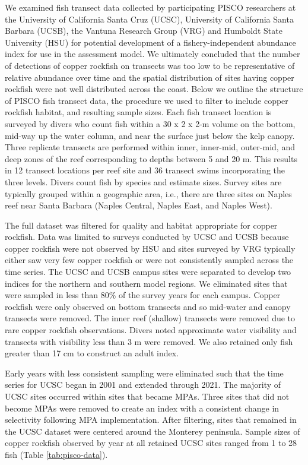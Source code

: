 \documentclass[11pt,
  english,
  letterpaper,
]{article}
\begin{document}
We examined fish transect data collected by participating PISCO researchers at the University of California Santa Cruz (UCSC), University of California Santa Barbara (UCSB), the Vantuna Research Group (VRG) and Humboldt State University (HSU) for potential development of a fishery-independent abundance index for use in the assessment model. We ultimately concluded that the number of detections of copper rockfish on transects was too low to be representative of relative abundance over time and the spatial distribution of sites having copper rockfish were not well distributed across the coast. Below we outline the structure of PISCO fish transect data, the procedure we used to filter to include copper rockfish habitat, and resulting sample sizes. Each fish transect location is surveyed by divers who count fish within a 30 x 2 x 2-m volume on the bottom, mid-way up the water column, and near the surface just below the kelp canopy. Three replicate transects are performed within inner, inner-mid, outer-mid, and deep zones of the reef corresponding to depths between 5 and 20 m. This results in 12 transect locations per reef site and 36 transect swims incorporating the three levels. Divers count fish by species and estimate sizes. Survey sites are typically grouped within a geographic area, i.e., there are three sites on Naples reef near Santa Barbara (Naples Central, Naples East, and Naples West).

The full dataset was filtered for quality and habitat appropriate for copper rockfish. Data was limited to surveys conducted by UCSC and UCSB because copper rockfish were not observed by HSU and sites surveyed by VRG typically either saw very few copper rockfish or were not consistently sampled across the time series. The UCSC and UCSB campus sites were separated to develop two indices for the northern and southern model regions. We eliminated sites that were sampled in less than 80\% of the survey years for each campus. Copper rockfish were only observed on bottom transects and so mid-water and canopy transects were removed. The inner reef (shallow) transects were removed due to rare copper rockfish observations. Divers noted approximate water visibility and transects with visibility less than 3 m were removed. We also retained only fish greater than 17 cm to construct an adult index.

Early years with less consistent sampling were eliminated such that the time series for UCSC began in 2001 and extended through 2021. The majority of UCSC sites occurred within sites that became MPAs. Three sites that did not become MPAs were removed to create an index with a consistent change in selectivity following MPA implementation. After filtering, sites that remained in the UCSC dataset were centered around the Monterey peninsula. Sample sizes of copper rockfish observed by year at all retained UCSC sites ranged from 1 to 28 fish (Table \ref{tab:pisco-data}).
\end{document}
